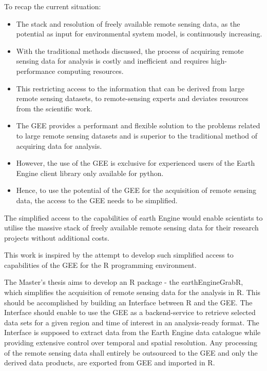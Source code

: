 \documentclass[12pt,twoside,a4paper,final]{report}
\begin{document}
To recap the current situation:
\begin{itemize}
	
	\item The stack and resolution of freely available remote sensing data, as the potential as input for environmental system model, is continuously increasing.
	\item With the traditional methods discussed, the process of acquiring remote sensing data for analysis is costly and inefficient and requires high-performance computing resources.
	\item This restricting access to the information that can be derived from large remote sensing datasets, to remote-sensing experts and deviates resources from the scientific work.
	\item The GEE provides a performant and flexible solution to the problems related to large remote sensing datasets and is superior to the traditional method of acquiring data for analysis.
	\item However, the use of the GEE is exclusive for experienced users of the Earth Engine client library only available for python.
	\item Hence, to use the potential of the GEE for the acquisition of remote sensing data, the access to the GEE needs to be simplified.
	
\end{itemize}

The simplified access to the capabilities of earth Engine would enable scientists to utilise the massive stack of freely available remote sensing data for their research projects without additional costs.

This work is inspired by the attempt to develop such simplified access to capabilities of the GEE for the R programming environment.

The Master's thesis aims to develop an R package - the earthEngineGrabR, which simplifies the acquisition of remote sensing data for the analysis in R. This should be accomplished by building an Interface between R and the GEE.
The Interface should enable to use the GEE as a backend-service to retrieve selected data sets for a given region and time of interest in an analysis-ready format. The Interface is supposed to extract data from the Earth Engine data catalogue while providing extensive control over temporal and spatial resolution. 
Any processing of the remote sensing data shall entirely be outsourced to the GEE and only the derived data products, are exported from GEE and imported in R. 
\end{document}
